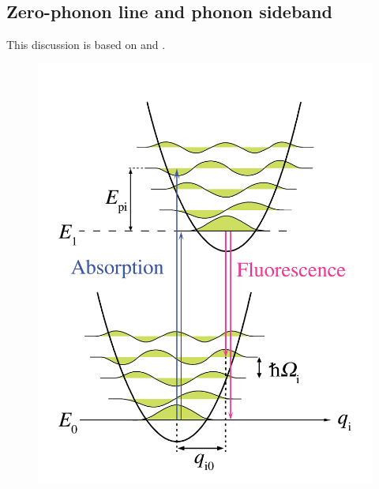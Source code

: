 \subsection{Zero-phonon line and phonon sideband}

This discussion is based on \textcite{friedrich_photochemical_1984} and \textcite{peter_phonon_2004}.

\begin{figure}[H]
	\centering
	\includegraphics[width=0.6\linewidth]{figures/quantum-dot/Phonon-energy-diagram}
	\caption{\cite{noauthor_zero-phonon_nodate}}
	\label{fig:phonon-energy-diagram}
\end{figure}


